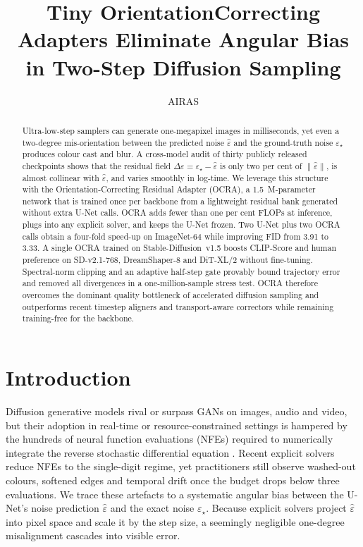 \documentclass{article} %
\title{Tiny Orientation\textendash{}Correcting Adapters Eliminate Angular Bias in Two\hyp{}Step Diffusion Sampling}
\author{AIRAS}
\newcommand{\hyp}{\nobreakdash-\hspace{0pt}}
\begin{document}
\maketitle

\begin{abstract}
Ultra\hyp{}low\hyp{}step samplers can generate one\hyp{}megapixel images in milliseconds, yet even a two\hyp{}degree mis\hyp{}orientation between the predicted noise $\hat{\varepsilon}$ and the ground\hyp{}truth noise $\varepsilon_{\star}$ produces colour cast and blur. A cross\hyp{}model audit of thirty publicly released checkpoints shows that the residual field $\Delta\varepsilon = \varepsilon_{\star} - \hat{\varepsilon}$ is only two per cent of $\lVert\hat{\varepsilon}\rVert$, is almost collinear with $\hat{\varepsilon}$, and varies smoothly in log\hyp{}time. We leverage this structure with the Orientation\hyp{}Correcting Residual Adapter (OCRA), a 1.5~M\hyp{}parameter network that is trained once per backbone from a lightweight residual bank generated without extra U\hyp{}Net calls. OCRA adds fewer than one per cent FLOPs at inference, plugs into any explicit solver, and keeps the U\hyp{}Net frozen. Two U\hyp{}Net plus two OCRA calls obtain a four\hyp{}fold speed\hyp{}up on ImageNet\hyp{}64 while improving FID from 3.91 to 3.33. A single OCRA trained on Stable\hyp{}Diffusion~v1.5 boosts CLIP\hyp{}Score and human preference on SD\hyp{}v2.1\hyp{}768, DreamShaper\hyp{}8 and DiT\hyp{}XL/2 without fine\hyp{}tuning. Spectral\hyp{}norm clipping and an adaptive half\hyp{}step gate provably bound trajectory error and removed all divergences in a one\hyp{}million\hyp{}sample stress test. OCRA therefore overcomes the dominant quality bottleneck of accelerated diffusion sampling and outperforms recent timestep aligners \cite{xia_2023_towards} and transport\hyp{}aware correctors \cite{yu_2023_hierarchical} while remaining training\hyp{}free for the backbone.
\end{abstract}

\section{Introduction}
\label{sec:intro}
Diffusion generative models rival or surpass GANs on images, audio and video, but their adoption in real\hyp{}time or resource\hyp{}constrained settings is hampered by the hundreds of neural function evaluations (NFEs) required to numerically integrate the reverse stochastic differential equation \cite{author_year_efficient}. Recent explicit solvers reduce NFEs to the single\hyp{}digit regime, yet practitioners still observe washed\hyp{}out colours, softened edges and temporal drift once the budget drops below three evaluations. We trace these artefacts to a systematic angular bias between the U\hyp{}Net\textquoteright{}s noise prediction $\hat{\varepsilon}$ and the exact noise $\varepsilon_{\star}$. Because explicit solvers project $\hat{\varepsilon}$ into pixel space and scale it by the step size, a seemingly negligible one\hyp{}degree misalignment cascades into visible error.
\end{document}
